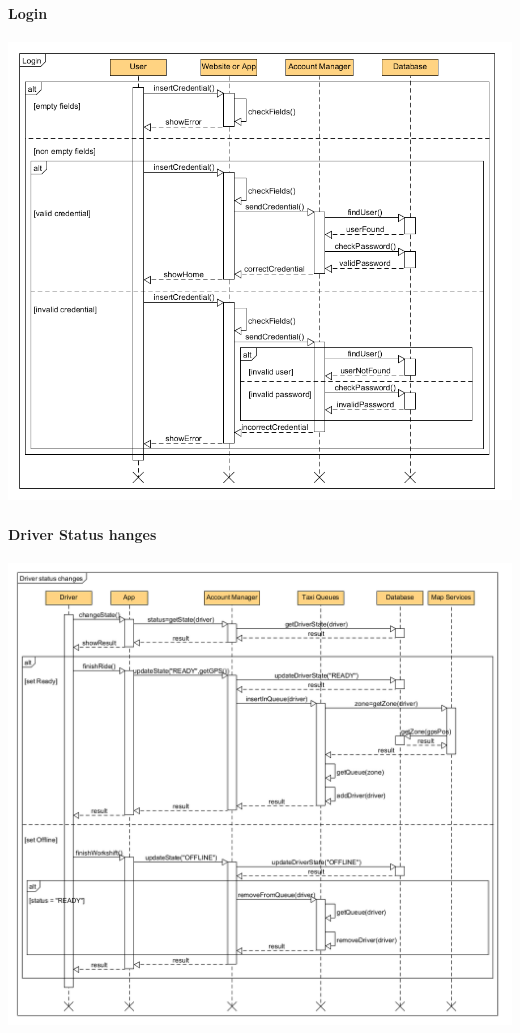 \paragraph{Login}
\begin{center}
	\includegraphics[width=\textwidth]{diagrams/Login.png}
\end{center}
\newpage
\paragraph{Driver Status hanges}
\begin{center}
	\includegraphics[width=\textwidth]{diagrams/driverChanges.png}
\end{center}


